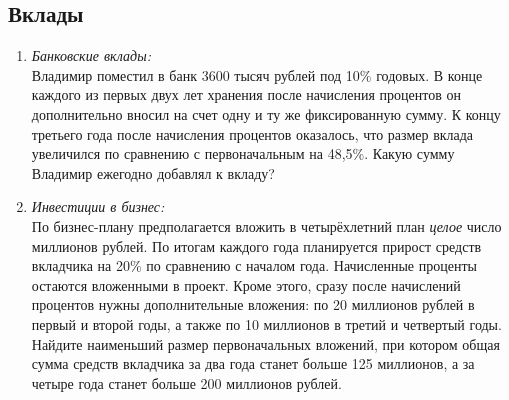\documentclass[12pt]{article}
\begin{document}
\subsection{Вклады}
    \begin{enumerate}[start=1,label={\itshape\bfseries \arabic*.}]
    \item \emph{Банковские вклады:}\\
    Владимир поместил в банк 3600 тысяч рублей под 10$\%$ годовых. В конце каждого из первых двух лет хранения после начисления процентов он дополнительно вносил на счет одну и ту же фиксированную сумму. К концу третьего года после начисления процентов оказалось, что размер вклада увеличился по сравнению с первоначальным на 48,5$\%$. Какую сумму Владимир ежегодно добавлял к вкладу?
    \item \emph{Инвестиции в бизнес:}\\
    По бизнес-плану предполагается вложить в четырёхлетний план \emph{целое} число миллионов рублей. По итогам каждого года планируется прирост средств вкладчика на 20$\%$ по сравнению с началом года. Начисленные проценты остаются вложенными в проект. Кроме этого, сразу после начислений процентов нужны дополнительные вложения: по 20 миллионов рублей в первый и второй годы, а также по 10 миллионов в третий и четвертый годы. Найдите наименьший размер первоначальных вложений, при котором общая сумма средств вкладчика за два года станет больше 125 миллионов, а за четыре года станет больше 200 миллионов рублей.
    \end{enumerate}
\end{document}
